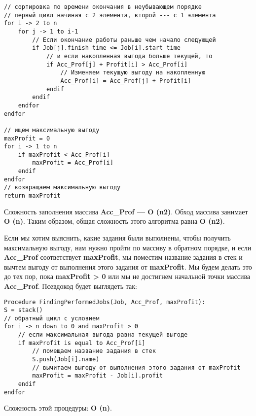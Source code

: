 \vspace{\baselineskip}
\begin{tcolorbox}
\begin{verbatim}
// сортировка по времени окончания в неубывающем порядке
// первый цикл начиная с 2 элемента, второй --- с 1 элемента
for i -> 2 to n
	for j -> 1 to i-1
		// Если окончание работы раньше чем начало следующей
		if Job[j].finish_time <= Job[i].start_time
			// и если накопленная выгода больше текущей, то 
			if Acc_Prof[j] + Profit[i] > Acc_Prof[i]
				// Изменяем текущую выгоду на накопленную
				Acc_Prof[i] = Acc_Prof[j] + Profit[i]
			endif
		endif
	endfor
endfor

// ищем максимальную выгоду
maxProfit = 0
for i -> 1 to n
	if maxProfit < Acc_Prof[i]
		maxProfit = Acc_Prof[i]
	endif
endfor
// возвращаем максимальную выгоду
return maxProfit
\end{verbatim}
\end{tcolorbox}

\vspace{\baselineskip}
Сложность заполнения массива \textbf{Acc\_Prof --- O (n2)}. Обход массива занимает \textbf{O (n)}. Таким образом, общая сложность этого алгоритма равна \textbf{O (n2)}. 

\vspace{\baselineskip}
Если мы хотим выяснить, какие задания были выполнены, чтобы получить максимальную выгоду, нам нужно пройти по массиву в обратном порядке, и если \textbf{Acc\_Prof} соответствует \textbf{maxProfit}, мы поместим название задания в стек и вычтем выгоду от выполнения этого задания от \textbf{maxProfit}. Мы будем делать это до тех пор, пока \textbf{maxProfit > 0} или мы не достигнем начальной точки массива \textbf{Acc\_Prof}. Псевдокод будет выглядеть так: 

\vspace{\baselineskip}
\begin{tcolorbox}
\begin{verbatim}
Procedure FindingPerformedJobs(Job, Acc_Prof, maxProfit):
S = stack()
// обратный цикл с условием
for i -> n down to 0 and maxProfit > 0
	// если максимальная выгода равна текущей выгоде
	if maxProfit is equal to Acc_Prof[i]
		// помещаем название задания в стек
		S.push(Job[i].name)
		// вычитаем выгоду от выполнения этого задания от maxProfit
		maxProfit = maxProfit - Job[i].profit
	endif
endfor
\end{verbatim}
\end{tcolorbox}

\vspace{\baselineskip}
Сложность этой процедуры: \textbf{O (n)}. 


